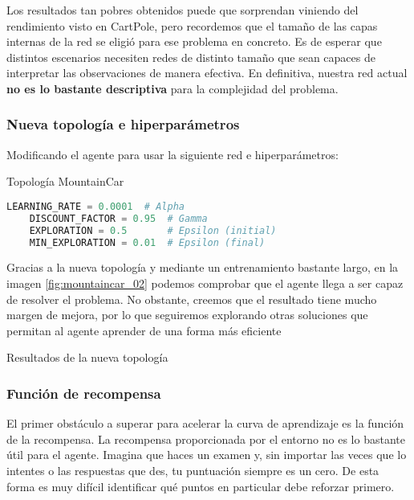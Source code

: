 Los resultados tan pobres obtenidos puede que sorprendan viniendo del rendimiento visto en CartPole, pero recordemos que el tamaño de las capas internas de la red se eligió para ese problema en concreto. Es de esperar que distintos escenarios necesiten redes de distinto tamaño que sean capaces de interpretar las observaciones de manera efectiva. En definitiva, nuestra red actual \textbf{no es lo bastante descriptiva} para la complejidad del problema.


\subsubsection{Nueva topología e hiperparámetros}

Modificando el agente para usar la siguiente red e hiperparámetros:

%
       {Topología MountainCar}

\begin{minipage}{0.9\linewidth}%
    \begin{lstlisting}[frame=tb, language=Python, caption=Hiperparámetros MountainCar, label=code:cartpole_drl]
    LEARNING_RATE = 0.0001  # Alpha
    DISCOUNT_FACTOR = 0.95  # Gamma
    EXPLORATION = 0.5       # Epsilon (initial)
    MIN_EXPLORATION = 0.01  # Epsilon (final)
    \end{lstlisting}%
\end{minipage}

Gracias a la nueva topología y mediante un entrenamiento bastante largo, en la imagen \ref{fig:mountaincar_02} podemos comprobar que el agente llega a ser capaz de resolver el problema. No obstante, creemos que el resultado tiene mucho margen de mejora, por lo que seguiremos explorando otras soluciones que permitan al agente aprender de una forma más eficiente

%
       {Resultados de la nueva topología}


\subsubsection{Función de recompensa}

El primer obstáculo a superar para acelerar la curva de aprendizaje es la función de la recompensa. La recompensa proporcionada por el entorno no es lo bastante útil para el agente. Imagina que haces un examen y, sin importar las veces que lo intentes o las respuestas que des, tu puntuación siempre es un cero. De esta forma es muy difícil identificar qué puntos en particular debe reforzar primero.

